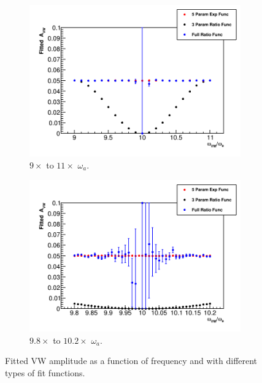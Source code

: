 \documentclass[12pt,letterpaper]{article}
\def\wa{$\omega_{a}$\xspace}
\begin{document}
\begin{figure}[]
\centering
    \begin{subfigure}[]{0.46\textwidth}
        \centering
        \includegraphics[width=\textwidth]{Fitted_Avw_Vs_Wvw-9x-10x}
        \caption{$9\times$ to $11\times$ \wa.}
    \end{subfigure}%
    \hspace{1cm}
    \begin{subfigure}[]{0.46\textwidth}
        \centering
        \includegraphics[width=\textwidth]{Fitted_Avw_Vs_Wvw-10x}
        \caption{$9.8\times$ to $10.2\times$ \wa.}
    \end{subfigure}
\caption[]{Fitted VW amplitude as a function of frequency and with different types of fit functions. }
\label{fig:FittedAVW_FullRatioFunc}
\end{figure}
\end{document}

